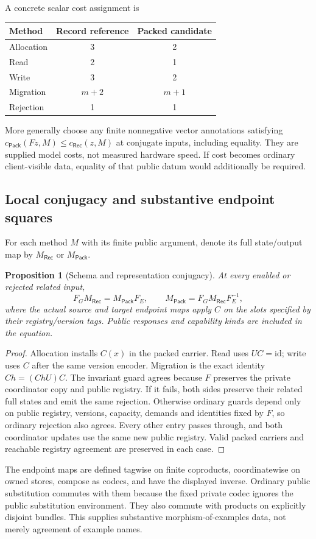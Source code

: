 \documentclass[11pt,a4paper]{article}
\newtheorem{proposition}[theorem]{Proposition}
\theoremstyle{definition}
\newcommand{\id}{\mathrm{id}}
\begin{document}
A concrete scalar cost assignment is
\begin{center}
\begin{tabular}{@{}lcc@{}}
\toprule Method&Record reference&Packed candidate\\\midrule
Allocation&3&2\\
Read&2&1\\
Write&3&2\\
Migration&$m+2$&$m+1$\\
Rejection&1&1\\
\bottomrule
\end{tabular}
\end{center}
More generally choose any finite nonnegative vector annotations satisfying
$c_{\mathsf{Pack}}(Fz,M)\leq c_{\mathsf{Rec}}(z,M)$ at conjugate inputs,
including equality. They are supplied model costs, not measured hardware
speed. If cost becomes ordinary client-visible data, equality of that
public datum would additionally be required.

\subsection{Local conjugacy and substantive endpoint squares}
For each method $M$ with its finite public argument, denote its full
state/output map by $M_{\mathsf{Rec}}$ or $M_{\mathsf{Pack}}$.
\begin{proposition}[Schema and representation conjugacy]\label{prop:B-conjugacy}
At every enabled or rejected related input,
\[
F_GM_{\mathsf{Rec}}=M_{\mathsf{Pack}}F_E,
\qquad
M_{\mathsf{Pack}}=F_GM_{\mathsf{Rec}}F_E^{-1},
\]
where the actual source and target endpoint maps apply $C$ on the slots
specified by their registry/version tags. Public responses and capability
kinds are included in the equation.
\end{proposition}
\begin{proof}
Allocation installs $C(x)$ in the packed carrier. Read uses $UC=\id$;
write uses $C$ after the same version encoder. Migration is the exact
identity $Ch=(ChU)C$. The invariant guard agrees because $F$ preserves the private coordinator
copy and public registry. If it fails, both sides preserve their related
full states and emit the same rejection. Otherwise ordinary guards depend
only on public registry, versions, capacity, demands and identities fixed
by $F$, so ordinary rejection also agrees.
Every other entry passes through, and both coordinator updates use the
same new public registry. Valid packed carriers and reachable registry
agreement are preserved in each case.
\end{proof}
The endpoint maps are defined tagwise on finite coproducts, coordinatewise
on owned stores, compose as codecs, and have the displayed inverse.
Ordinary public substitution commutes with them because the fixed private
codec ignores the public substitution environment. They also commute with
products on explicitly disjoint bundles. This supplies substantive
morphism-of-examples data, not merely agreement of example names.
\end{document}
